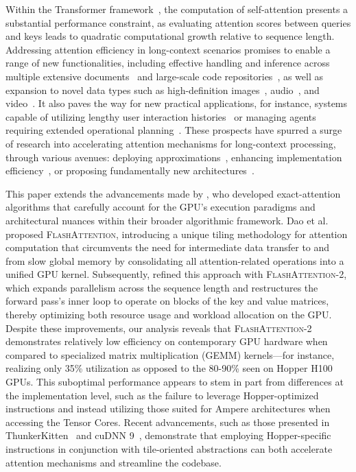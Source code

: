 Within the Transformer framework~\citep{vaswani2017attention}, the computation of self-attention presents a substantial performance constraint, as evaluating attention scores between queries and keys leads to quadratic computational growth relative to sequence length. Addressing attention efficiency in long-context scenarios promises to enable a range of new functionalities, including effective handling and inference across multiple extensive documents~\citep{guo2021longt5,shaham2022scrolls,peng2023yarn} and large-scale code repositories~\citep{roziere2023code, li2023starcoder}, as well as expansion to novel data types such as high-definition images~\citep{chen2022scaling}, audio~\citep{gulati2020conformer}, and video~\citep{ho2022video}. It also paves the way for new practical applications, for instance, systems capable of utilizing lengthy user interaction histories~\citep{sun2019bert4rec} or managing agents requiring extended operational planning~\citep{yao2022react}. These prospects have spurred a surge of research into accelerating attention mechanisms for long-context processing, through various avenues: deploying approximations~\citep{katharopoulos2020transformers,choromanski2020rethinking, tay2020efficient}, enhancing implementation efficiency~\citep{rabe2021self,dao2022flashattention,kwon2023efficient}, or proposing fundamentally new architectures~\citep{peng2023rwkv,sun2023retentive,gu2023mamba}.

This paper extends the advancements made by \citet{dao2022flashattention}, who developed exact-attention algorithms that carefully account for the GPU’s execution paradigms and architectural nuances within their broader algorithmic framework. Dao et al. \citep{dao2022flashattention} proposed \textsc{FlashAttention}, introducing a unique tiling methodology for attention computation that circumvents the need for intermediate data transfer to and from slow global memory by consolidating all attention-related operations into a unified GPU kernel. Subsequently, \citet{dao2023flashattention2} refined this approach with \textsc{FlashAttention-2}, which expands parallelism across the sequence length and restructures the forward pass’s inner loop to operate on blocks of the key and value matrices, thereby optimizing both resource usage and workload allocation on the GPU. Despite these improvements, our analysis reveals that \textsc{FlashAttention-2} demonstrates relatively low efficiency on contemporary GPU hardware when compared to specialized matrix multiplication (GEMM) kernels—for instance, realizing only 35\% utilization as opposed to the 80-90\% seen on Hopper H100 GPUs. This suboptimal performance appears to stem in part from differences at the implementation level, such as the failure to leverage Hopper-optimized instructions and instead utilizing those suited for Ampere architectures when accessing the Tensor Cores. Recent advancements, such as those presented in ThunkerKitten~\citep{spector2024thunder} and cuDNN 9~\citep{cudnn9}, demonstrate that employing Hopper-specific instructions in conjunction with tile-oriented abstractions can both accelerate attention mechanisms and streamline the codebase.

